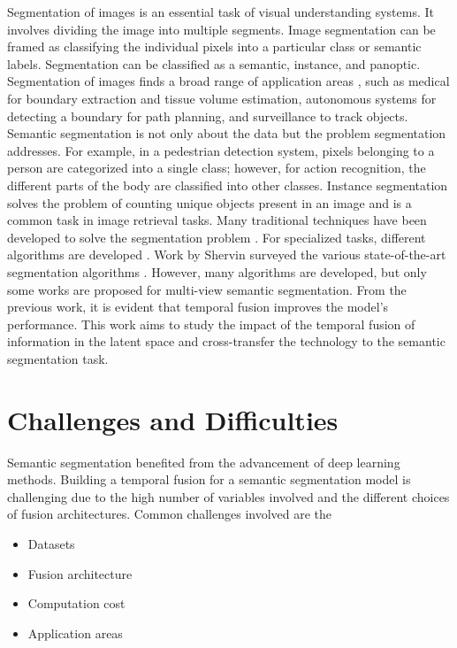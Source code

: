 	Segmentation of images is an essential task of visual understanding systems. It involves dividing the image into multiple segments. Image segmentation can be framed as classifying the individual pixels into a particular class or semantic labels. Segmentation can be classified as a semantic, instance, and panoptic. Segmentation of images finds a broad range of application areas \cite{21_forsyth2011computer}, such as medical for boundary extraction and tissue volume estimation, autonomous systems for detecting a boundary for path planning, and surveillance to track objects. Semantic segmentation is not only about the data but the problem segmentation addresses. For example, in a pedestrian detection system, pixels belonging to a person are categorized into a single class; however, for action recognition, the different parts of the body are classified into other classes. Instance segmentation \cite{22_dai2016instance} solves the problem of counting unique objects present in an image and is a common task in image retrieval tasks. Many traditional techniques have been developed to solve the segmentation problem \cite{23_fu1981survey}. For specialized tasks, different algorithms are developed \cite{24_ladys1994colour}. Work by Shervin surveyed the various state-of-the-art segmentation algorithms \cite{25_minaee2021image}. However, many algorithms are developed, but only some works are proposed for multi-view semantic segmentation. From the previous work, it is evident that temporal fusion improves the model's performance. This work aims to study the impact of the temporal fusion of information in the latent space and cross-transfer the technology to the semantic segmentation task. 

    \section{Challenges and Difficulties}
    
	Semantic segmentation benefited from the advancement of deep learning methods. Building a temporal fusion for a semantic segmentation model is challenging due to the high number of variables involved and the different choices of fusion architectures. Common challenges involved are the 
   
    \begin{itemize}
    	\setlength\itemsep{0.01em}
    	\item Datasets
    	\item Fusion architecture
    	\item Computation cost
    	\item Application areas
    \end{itemize}
	
